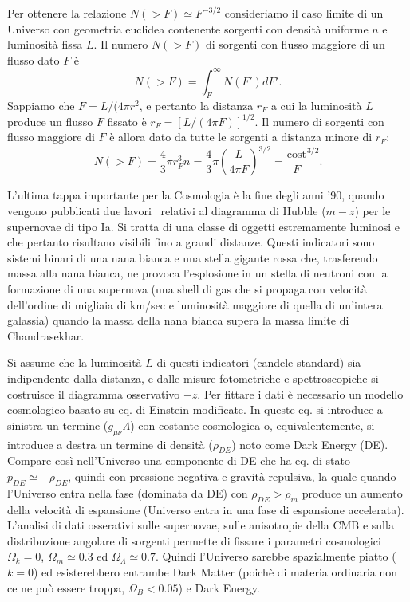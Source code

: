 Per ottenere la relazione $N(>F) \simeq F^{-3/2}$ consideriamo il caso limite di
un Universo con geometria euclidea contenente sorgenti con densità uniforme $n$
e luminosità fissa $L$.  Il numero $N(>F)$ di sorgenti con flusso maggiore di un
flusso dato $F$ è
\begin{equation}
  N(>F) = \int_F^{\infty} N(F') dF'.
\end{equation}
Sappiamo che $F=L/(4 \pi r^2$, e pertanto la distanza $r_F$ a cui la luminosità
$L$ produce un flusso $F$ fissato è $r_F=[L/(4 \pi F)]^{1/2}$.  Il numero di
sorgenti con flusso maggiore di $F$ è allora dato da tutte le sorgenti a
distanza minore di $r_F$:
\begin{equation}
  N(>F) = \frac{4}{3}\pi r_F^3 n = \frac{4}{3}\pi \left( \frac{L}{4 \pi F}
  \right)^{3/2} = \frac{\text{cost}}{F}^{3/2}.
\end{equation}

L'ultima tappa importante per la Cosmologia è la fine degli anni '90, quando
vengono pubblicati due
lavori~\parencites{1998AJ....116.1009R}{1999ApJ...517..565P} relativi al
diagramma di Hubble ($m-z$) per le supernovae di tipo Ia.  Si tratta di una
classe di oggetti estremamente luminosi e che pertanto risultano visibili fino a
grandi distanze.  Questi indicatori sono sistemi binari di una nana bianca e una
stella gigante rossa che, trasferendo massa alla nana bianca, ne provoca
l'esplosione in un stella di neutroni con la formazione di una supernova (una
shell di gas che si propaga con velocità dell'ordine di migliaia di km/sec e
luminosità maggiore di quella di un'intera galassia) quando la massa della nana
bianca supera la massa limite di Chandrasekhar.

Si assume che la luminosità $L$ di questi indicatori (candele standard) sia
indipendente dalla distanza, e dalle misure fotometriche e spettroscopiche si
costruisce il diagramma osservativo $-z$.  Per fittare i dati è necessario un
modello cosmologico basato su eq. di Einstein modificate.  In queste eq. si
introduce a sinistra un termine ($g_{\mu \nu} \Lambda$) con costante cosmologica
o, equivalentemente, si introduce a destra un termine di densità ($\rho_{DE}$)
noto come Dark Energy (DE).  Compare così nell'Universo una componente di DE che
ha eq. di stato $p_{DE} \simeq -\rho_{DE}$, quindi con pressione negativa e
gravità repulsiva, la quale quando l'Universo entra nella fase (dominata da DE)
con $\rho_{DE} > \rho_{m}$ produce un aumento della velocità di espansione
(Universo entra in una fase di espansione accelerata).  L'analisi di dati
osserativi sulle supernovae, sulle anisotropie della CMB e sulla distribuzione
angolare di sorgenti permette di fissare i parametri cosmologici $\Omega_k=0$,
$\Omega_m \simeq 0.3$ ed $\Omega_{\Lambda} \simeq 0.7$.  Quindi l'Universo
sarebbe spazialmente piatto ($k=0$) ed esisterebbero entrambe Dark Matter
(poichè di materia ordinaria non ce ne può essere troppa, $\Omega_{B}< 0.05$) e
Dark Energy.


